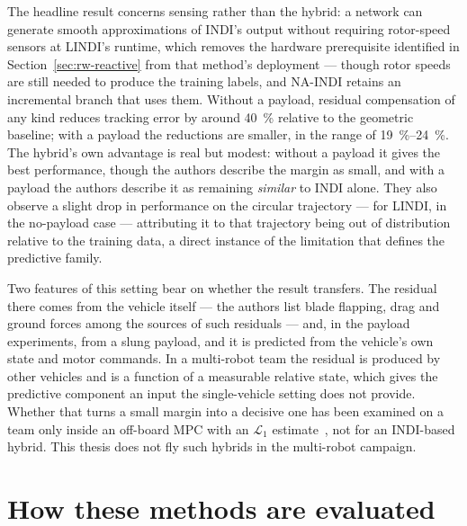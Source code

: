 The headline result concerns sensing rather than the hybrid: a network can generate smooth
approximations of INDI's output without requiring rotor-speed sensors at LINDI's runtime, which
removes the hardware prerequisite identified in Section~\ref{sec:rw-reactive} from that method's
deployment --- though rotor speeds are still needed to produce the training labels, and NA-INDI
retains an incremental branch that uses them. Without a payload, residual compensation of any kind
reduces tracking error by around \SI{40}{\percent} relative to the geometric baseline; with a
payload the reductions are smaller, in the range of \SIrange{19}{24}{\percent}. The hybrid's own
advantage is real but modest: without a payload it gives the best performance, though the authors
describe the margin as small, and with a payload the authors describe it as remaining
\emph{similar} to INDI alone. They also observe a slight drop in performance on the circular
trajectory --- for LINDI, in the no-payload case --- attributing it to that trajectory being out of
distribution relative to the training data, a direct instance of the limitation that defines the
predictive family.

Two features of this setting bear on whether the result transfers. The residual there comes from
the vehicle itself --- the authors list blade flapping, drag and ground forces among the sources of
such residuals --- and, in the payload experiments, from a slung payload, and it is predicted from
the vehicle's own state and motor commands. In a multi-robot team the residual is produced by other
vehicles and is a function of a measurable relative state, which gives the predictive component an
input the single-vehicle setting does not provide. Whether that turns a small margin into a
decisive one has been examined on a team only inside an off-board MPC with an $\mathcal{L}_1$
estimate~\cite{hsieh2025onlineadaptation}, not for an INDI-based hybrid. This thesis does not
fly such hybrids in the multi-robot campaign.

\section{How these methods are evaluated}
\label{sec:rw-eval}

